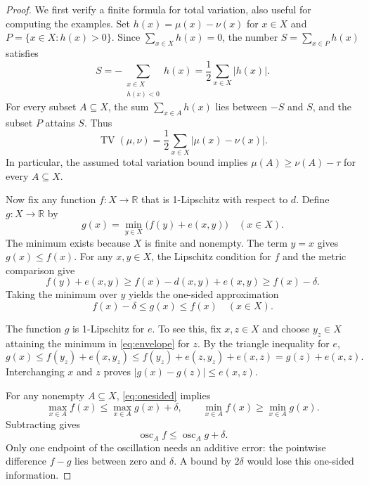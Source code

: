 \documentclass[a4paper,11pt]{article}
\DeclareMathOperator{\osc}{osc}
\DeclareMathOperator{\TV}{TV}
\begin{document}
\begin{proof}
We first verify a finite formula for total variation, also useful for
computing the examples. Set $h(x)=\mu(x)-\nu(x)$ for $x\in X$ and
$P=\{x\in X:h(x)>0\}$. Since $\sum_{x\in X}h(x)=0$, the number
$S=\sum_{x\in P}h(x)$ satisfies
\[
 S=-\sum_{\substack{x\in X\\h(x)<0}}h(x)
   =\frac12\sum_{x\in X}|h(x)|.
\]
For every subset $A\subseteq X$, the sum $\sum_{x\in A}h(x)$ lies
between $-S$ and $S$, and the subset $P$ attains $S$. Thus
\begin{equation}\label{eq:tvsum}
 \TV(\mu,\nu)=\frac12\sum_{x\in X}|\mu(x)-\nu(x)|.
\end{equation}
In particular, the assumed total variation bound implies
$\mu(A)\ge\nu(A)-\tau$ for every $A\subseteq X$.

Now fix any function $f:X\to\mathbb R$ that is 1-Lipschitz with respect to $d$. Define
$g:X\to\mathbb R$ by
\begin{equation}\label{eq:envelope}
 g(x)=\min_{y\in X}\bigl(f(y)+e(x,y)\bigr)\quad(x\in X).
\end{equation}
The minimum exists because $X$ is finite and nonempty. The term $y=x$
gives $g(x)\le f(x)$. For any $x,y\in X$, the Lipschitz condition for
$f$ and the metric comparison give
\[
 f(y)+e(x,y)
 \ge f(x)-d(x,y)+e(x,y)
 \ge f(x)-\delta.
\]
Taking the minimum over $y$ yields the one-sided approximation
\begin{equation}\label{eq:onesided}
 f(x)-\delta\le g(x)\le f(x)\quad(x\in X).
\end{equation}

The function $g$ is 1-Lipschitz for $e$. To see this, fix $x,z\in X$
and choose $y_z\in X$ attaining the minimum in \eqref{eq:envelope}
for $z$. By the triangle inequality for $e$,
\[
 g(x)\le f(y_z)+e(x,y_z)
       \le f(y_z)+e(z,y_z)+e(x,z)
       =g(z)+e(x,z).
\]
Interchanging $x$ and $z$ proves
$|g(x)-g(z)|\le e(x,z)$.

For any nonempty $A\subseteq X$, \eqref{eq:onesided} implies
\[
 \max_{x\in A}f(x)\le\max_{x\in A}g(x)+\delta,
 \qquad
 \min_{x\in A}f(x)\ge\min_{x\in A}g(x).
\]
Subtracting gives
\begin{equation}\label{eq:oscillation}
 \osc_A f\le\osc_A g+\delta.
\end{equation}
Only one endpoint of the oscillation needs an additive error: the
pointwise difference $f-g$ lies between zero and $\delta$. A bound by
$2\delta$ would lose this one-sided information.


\end{proof}
\end{document}
